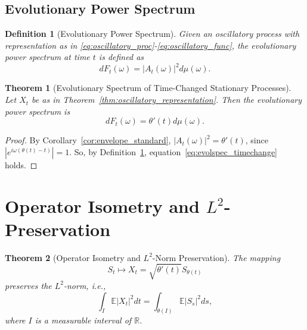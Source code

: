 \documentclass[12pt]{article}
\newtheorem{definition}{Definition}[section]
\newtheorem{theorem}{Theorem}[section]
\begin{document}
\subsection{Evolutionary Power Spectrum}

\begin{definition}[Evolutionary Power Spectrum]\label{def:evol_spectrum}
Given an oscillatory process with representation as in \eqref{eq:oscillatory_proc}-\eqref{eq:oscillatory_func}, the evolutionary power spectrum at time $t$ is defined as 
\begin{equation}
    dF_t(\omega) = |A_t(\omega)|^2 d\mu(\omega).
    \label{eq:evol_spectrum}
\end{equation}
\end{definition}

\begin{theorem}[Evolutionary Spectrum of Time-Changed Stationary Processes]\label{thm:evol_spectrum_timechange}
Let $X_t$ be as in Theorem~\ref{thm:oscillatory_representation}. Then the evolutionary power spectrum is 
\begin{equation}
    dF_t(\omega) = \theta'(t) d\mu(\omega). \label{eq:evolspec_timechange}
\end{equation}
\end{theorem}

\begin{proof}
By Corollary~\ref{cor:envelope_standard}, $|A_t(\omega)|^2 = \theta'(t)$, since $|e^{i\omega(\theta(t) - t)}|=1$. So, by Definition~\ref{def:evol_spectrum}, equation~\eqref{eq:evolspec_timechange} holds.
\end{proof}

\section{Operator Isometry and $L^2$-Preservation}\label{sec:isometry}

\begin{theorem}[Operator Isometry and $L^2$-Norm Preservation]\label{thm:L2_isometry}
The mapping
\begin{equation}
    S_t \mapsto X_t = \sqrt{\theta'(t)} S_{\theta(t)}
    \label{eq:M_theta}
\end{equation}
preserves the $L^2$-norm, i.e.,
\begin{equation}
    \int_{I} \mathbb{E}|X_t|^2 dt = \int_{\theta(I)} \mathbb{E}|S_s|^2 ds,
    \label{eq:L2_preserving}
\end{equation}
where $I$ is a measurable interval of $\mathbb{R}$.
\end{theorem}
\end{document}
